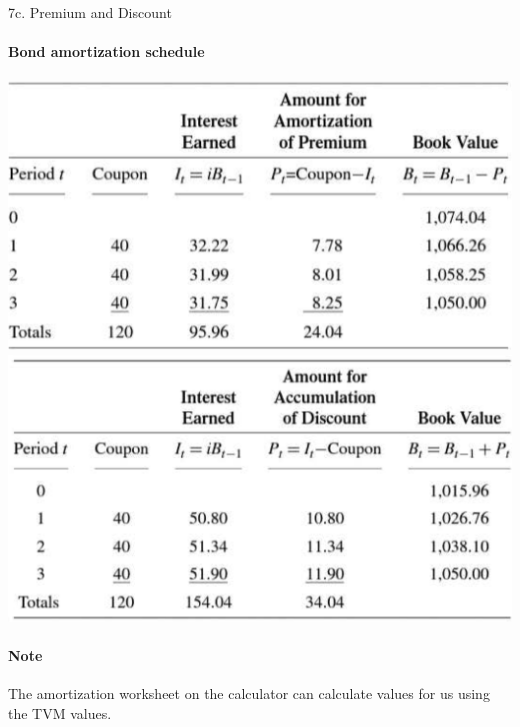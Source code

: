 \begin{CHPT_SUMM_AUTO}[label = {L.-7c}]{7c. Premium and Discount}
	
\paragraph*{Bond amortization schedule}
\begin{center}
	\includegraphics[scale=0.4]{img/amortization-schedule-bonds.png}
	\includegraphics[scale=0.4]{img/amortization-schedule-bonds-discount.png}
\end{center}

\paragraph*{Note}	The amortization worksheet on the calculator can calculate values for us using the TVM values.
\end{CHPT_SUMM_AUTO}

